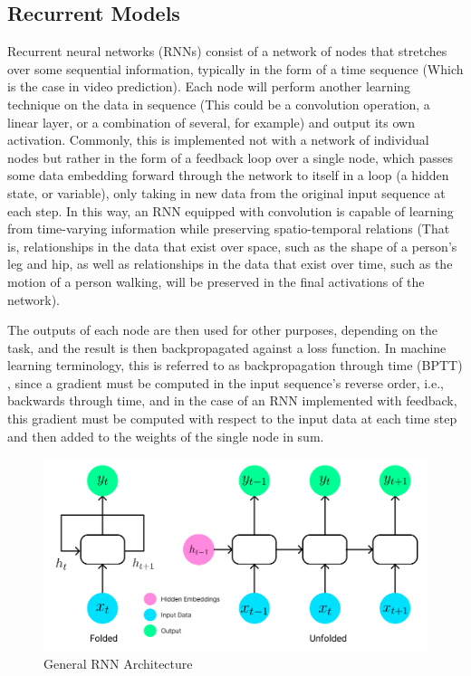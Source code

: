\documentclass{scrartcl}
\begin{document}
\subsection{Recurrent Models}
\label{subsec:recurrent}

Recurrent neural networks (RNNs) consist of a network of nodes that stretches
over some sequential information, typically in the form of a time sequence
(Which is the case in video prediction). Each node will perform another
learning technique on the data in sequence (This could be a convolution
operation, a linear layer, or a combination of several, for example) and output
its own activation. Commonly, this is implemented not with a network of
individual nodes but rather in the form of a feedback loop over a single node,
which passes some data embedding forward through the network to itself in a
loop (a hidden state, or variable), only taking in new data from the original
input sequence at each step. In this way, an RNN equipped with convolution is
capable of learning from time-varying information while preserving
spatio-temporal relations (That is, relationships in the data that exist over
space, such as the shape of a person's leg and hip, as well as relationships in
the data that exist over time, such as the motion of a person walking, will be
preserved in the final activations of the network).

The outputs of each node are then used for other purposes, depending on the
task, and the result is then backpropagated against a loss function. In machine
learning terminology, this is referred to as backpropagation through time
(BPTT) \cite{rnn_and_lstm_fundamentals}, since a gradient must be computed in
the input sequence's reverse order, i.e., backwards through time, and in the
case of an RNN implemented with feedback, this gradient must be computed with
respect to the input data at each time step and then added to the weights of
the single node in sum.

\begin{figure}[H]
	\begin{center}
		\includegraphics[width=1\textwidth]{figures/rnn_arch.png}
	\end{center}
	\caption{General RNN Architecture}
	\label{fig:rnn_arch}
\end{figure}
\end{document}
